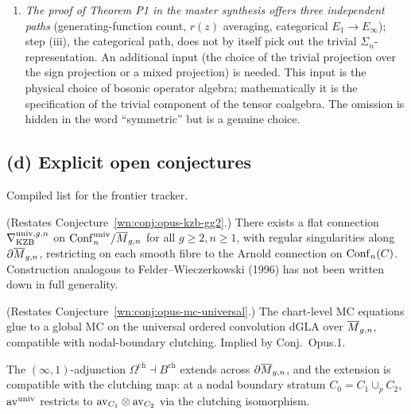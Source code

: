 \begin{enumerate}
\item \emph{The proof of Theorem P1 in the master synthesis offers
three independent paths} (generating-function count, $r(z)$ averaging,
categorical $E_1 \to E_\infty$); step (iii), the categorical path, does
not by itself pick out the trivial $\Sigma_n$-representation. An
additional input (the choice of the trivial projection over the
sign projection or a mixed projection) is needed. This input is the
physical choice of bosonic operator algebra; mathematically it is the
specification of the trivial component of the tensor coalgebra. The
omission is hidden in the word ``symmetric'' but is a genuine choice.
\end{enumerate}

\subsection*{(d) Explicit open conjectures}

Compiled list for the frontier tracker.

\begin{conjecture}
\label{wn:conj:opus-final-KZB}\ClaimStatusConjectured
(Restates Conjecture~\ref{wn:conj:opus-kzb-gg2}.) There exists a flat
connection $\nabla_{\mathrm{KZB}}^{\mathrm{univ}, g, n}$ on
$\mathrm{Conf}_n^{\mathrm{univ}} / \overline{M}_{g,n}$ for all $g \ge 2, n \ge 1$,
with regular singularities along $\partial \overline{M}_{g,n}$, restricting
on each smooth fibre to the Arnold connection on $\mathrm{Conf}_n(C)$.
Construction analogous to Felder--Wieczerkowski (1996) has not been
written down in full generality.
\end{conjecture}

\begin{conjecture}
\label{wn:conj:opus-final-MC}\ClaimStatusConjectured
(Restates Conjecture~\ref{wn:conj:opus-mc-universal}.) The chart-level MC
equations glue to a global MC on the universal ordered convolution
dGLA over $\overline{M}_{g,n}$, compatible with nodal-boundary clutching.
Implied by Conj.\ Opus.1.
\end{conjecture}

\begin{conjecture}
\label{wn:conj:opus-final-clutch}\ClaimStatusConjectured
The $(\infty,1)$-adjunction $\Omega^{\mathrm{ch}} \dashv B^{\mathrm{ch}}$
extends across $\partial \overline{M}_{g,n}$, and the extension is
compatible with the clutching map: at a nodal boundary stratum
$C_0 = C_1 \cup_p C_2$, $\mathrm{av}^{\mathrm{univ}}$ restricts to
$\mathrm{av}_{C_1} \otimes \mathrm{av}_{C_2}$ via the clutching isomorphism.
\end{conjecture}

